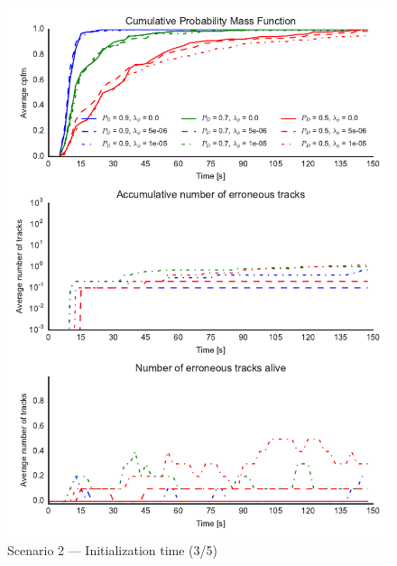 \begin{figure}
\centering
\includegraphics{Figures/plots/Scenario2_Init-Time(3-5).pdf}
\caption{Scenario 2 --- Initialization time (3/5)}\label{fig:init2_time_3-5}
\end{figure}

